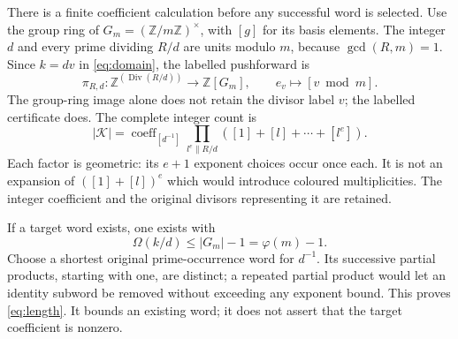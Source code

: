 There is a finite coefficient calculation before any successful word is selected.
Use the group ring of $G_m=(\mathbb Z/m\mathbb Z)^\times$, with $[g]$ for its
basis elements.  The integer $d$ and every prime dividing $R/d$ are units
modulo $m$, because $\gcd(R,m)=1$.  Since $k=dv$ in \eqref{eq:domain},
the labelled pushforward is
\[
 \pi_{R,d}:\mathbb Z^{(\operatorname{Div}(R/d))}\longrightarrow
 \mathbb Z[G_m],\qquad e_v\longmapsto[v\bmod m].
\]
The group-ring image alone does not retain the divisor label $v$; the labelled
certificate does.  The complete integer count is
\begin{equation}\label{eq:poly}
 |\mathcal K|=\operatorname{coeff}_{[d^{-1}]}
 \prod_{l^e\parallel R/d}
       \left([1]+[l]+\cdots+[l^e]\right).
\end{equation}
Each factor is geometric: its $e+1$ exponent choices occur once each. It is not
an expansion of $([1]+[l])^e$ which would introduce coloured multiplicities.
The integer coefficient and the original divisors representing it are retained.

If a target word exists, one exists with
\begin{equation}\label{eq:length}
 \Omega(k/d)\le |G_m|-1=\varphi(m)-1.
\end{equation}
Choose a shortest original prime-occurrence word for $d^{-1}$. Its successive
partial products, starting with one, are distinct; a repeated partial product
would let an identity subword be removed without exceeding any exponent bound.
This proves \eqref{eq:length}. It bounds an existing word; it does not assert
that the target coefficient is nonzero.

